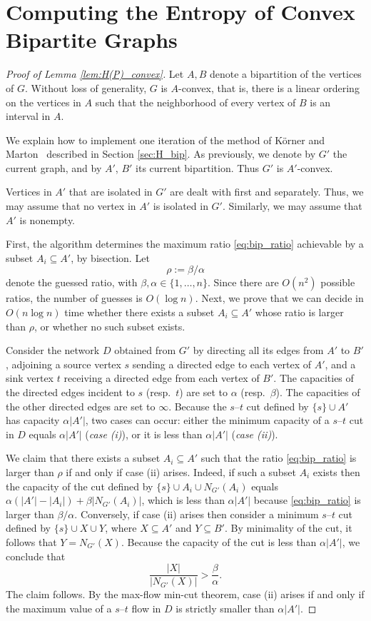 \documentclass{article} \usepackage{fullpage}
\begin{document}
\section{Computing the Entropy of Convex Bipartite Graphs}
\label{app:bip_convex}

\begin{proof}[Proof of Lemma \ref{lem:H(P)_convex}]
Let $A, B$ denote a bipartition of the vertices of $G$. Without loss of generality, $G$ is $A$-convex, that is, there is a linear ordering on the vertices in $A$ such that the neighborhood of every vertex of $B$ is an interval in $A$. 

We explain how to implement one iteration of the method of K\"orner and Marton~\cite{KM88} described in Section \ref{sec:H_bip}. As previously, we denote by $G'$ the current graph, and by $A'$, $B'$ its current bipartition. Thus $G'$ is $A'$-convex.

Vertices in $A'$ that are isolated in $G'$ are dealt with first and separately. Thus, we may assume that no vertex in $A'$ is isolated in $G'$. Similarly, we may assume that $A'$ is nonempty. 

First, the algorithm determines the maximum ratio \eqref{eq:bip_ratio} achievable by a subset $A_i \subseteq A'$, by bisection. Let
$$
\rho := \beta / \alpha
$$ 
denote the guessed ratio, with $\beta, \alpha \in \{1,\ldots,n\}$. Since there are $O(n^2)$ possible ratios, the number of guesses is $O(\log n)$. Next, we prove that we can decide in $O(n \log n)$ time whether there exists a subset $A_i \subseteq A'$ whose ratio is larger than $\rho$, or whether no such subset exists.

Consider the network $D$ obtained from $G'$ by directing all its edges from $A'$ to $B'$, adjoining a source vertex $s$ sending a directed edge to each vertex of $A'$, and a sink vertex $t$ receiving a directed edge from each vertex of $B'$. The capacities of the directed edges incident to $s$ (resp.\ $t$) are set to $\alpha$ (resp.\ $\beta$). The capacities of the other directed edges are set to $\infty$. Because the $s$--$t$ cut defined by $\{s\} \cup A'$ has capacity $\alpha |A'|$, two cases can occur: either the minimum capacity of a $s$--$t$ cut in $D$ equals $\alpha |A'|$ ({\sl case (i)\/}), or it is less than $\alpha |A'|$ ({\sl case (ii)\/}). 

We claim that there exists a subset $A_i \subseteq A'$ such that the ratio \eqref{eq:bip_ratio} is larger than $\rho$ if and only if case (ii) arises. Indeed, if such a subset $A_i$ exists then the capacity of the cut defined by $\{s\} \cup A_i \cup N_{G'}(A_i)$ equals $\alpha(|A'| - |A_i|) + \beta |N_{G'}(A_i)|$, which is less than $\alpha |A'|$ because \eqref{eq:bip_ratio} is larger than $\beta / \alpha$. Conversely, if case (ii) arises then consider a minimum $s$--$t$ cut defined by $\{s\} \cup X \cup Y$, where $X \subseteq A'$ and $Y \subseteq B'$. By minimality of the cut, it follows that $Y = N_{G'}(X)$.
Because the capacity of the cut is less than $\alpha |A'|$, we conclude that
$$
\frac{|X|}{|N_{G'}(X)|} > \frac{\beta}{\alpha}.
$$
The claim follows. By the max-flow min-cut theorem, case (ii) arises if and only if the maximum value of a $s$--$t$ flow in $D$ is strictly smaller than $\alpha |A'|$. 


\end{proof}
\end{document}
